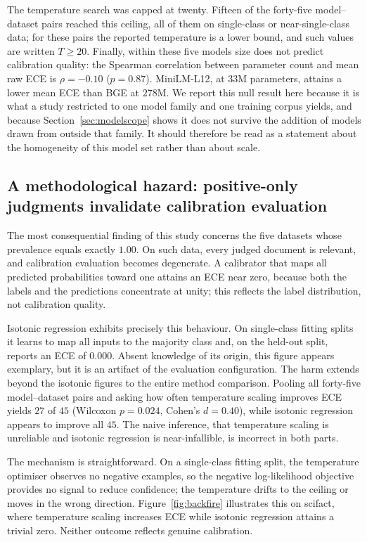 \documentclass[sn-mathphys-num,pdflatex]{sn-jnl}
\begin{document}
The temperature search was capped at twenty. Fifteen of the forty-five
model--dataset pairs reached this ceiling, all of them on single-class or
near-single-class data; for these pairs the reported temperature is a lower bound,
and such values are written $T \geq 20$. Finally, within these five models size does not
predict calibration quality: the Spearman correlation between parameter count and
mean raw ECE is $\rho = -0.10$ ($p = 0.87$). MiniLM-L12, at $33$M parameters,
attains a lower mean ECE than BGE at $278$M. We report this null result here
because it is what a study restricted to one model family and one training corpus
yields, and because Section~\ref{sec:modelscope} shows it does not survive the
addition of models drawn from outside that family. It should therefore be read as
a statement about the homogeneity of this model set rather than about scale.

\subsection{A methodological hazard: positive-only judgments invalidate
calibration evaluation}\label{sec:hazard}
The most consequential finding of this study concerns the five datasets whose
prevalence equals exactly $1.00$. On such data, every judged document is relevant,
and calibration evaluation becomes degenerate. A calibrator that maps all
predicted probabilities toward one attains an ECE near zero, because both the
labels and the predictions concentrate at unity; this reflects the label
distribution, not calibration quality.

Isotonic regression exhibits precisely this behaviour. On single-class fitting
splits it learns to map all inputs to the majority class and, on the held-out
split, reports an ECE of $0.000$. Absent knowledge of its origin, this figure
appears exemplary, but it is an artifact of the evaluation configuration. The harm
extends beyond the isotonic figures to the entire method comparison. Pooling all
forty-five model--dataset pairs and asking how often temperature scaling improves
ECE yields $27$ of $45$ (Wilcoxon $p = 0.024$, Cohen's $d = 0.40$), while isotonic
regression appears to improve all $45$. The naive inference, that temperature
scaling is unreliable and isotonic regression is near-infallible, is incorrect in
both parts.

The mechanism is straightforward. On a single-class fitting split, the temperature
optimiser observes no negative examples, so the negative log-likelihood objective
provides no signal to reduce confidence; the temperature drifts to the ceiling or
moves in the wrong direction. Figure~\ref{fig:backfire} illustrates this on
scifact, where temperature scaling increases ECE while isotonic regression attains
a trivial zero. Neither outcome reflects genuine calibration.
\end{document}
